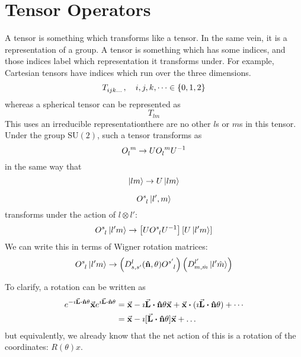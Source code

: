 \documentclass[a4paper,twoside,master.tex]{subfiles}
\begin{document}

\section{Tensor Operators}
\label{sec:tensor_operators}

A tensor is something which transforms like a tensor. In the same vein, it is a representation of a group. A tensor is something which has some indices, and those indices label which representation it transforms under. For example, Cartesian tensors have indices which run over the three dimensions.
\begin{equation}
    T\indices{_{ijk\ldots}} \qc i,j,k,\cdots \in \{0,1,2\}
\end{equation}
whereas a spherical tensor can be represented as
\begin{equation}
    T_{lm}
\end{equation}
This uses an irreducible representation\textemdash there are no other $ l $s or $ m $s in this tensor. Under the group $\text{SU}(2)$, such a tensor transforms as
\begin{equation}
    O\indices{_l^m} \to U O\indices{_l^m} U^{-1}
\end{equation}
in the same way that
\begin{equation}
    \ket{lm} \to U\ket{lm}
\end{equation}

\begin{equation}
    O\indices{^s_l}\ket{l',m}
\end{equation}
transforms under the action of $ l \otimes l' $:
\begin{equation}
    O\indices{^s_l}\ket{l'm} \to \left[ U O\indices{^s_l} U^{-1} \right] \left[ U\ket{l'm} \right]
\end{equation}
We can write this in terms of Wigner rotation matrices:
\begin{equation}
    O\indices{^s_l}\ket{l'm} \to \left( D^l_{s,s'}(\vu{n}, \theta) O\indices{^{s'}_l} \right) \left( D^{l'}_{m,\hat{m}}\ket{l'\hat{m}} \right)
\end{equation}

To clarify, a rotation can be written as
\begin{align}
    e^{- \imath \va{L} \vdot \vu{n} \theta} \va{x} e^{\imath \va{L} \vdot \vu{n} \theta} &= \va{x} - \imath \va{L} \vdot \vu{n} \theta \va{x} + \va{x} \vdot (\imath \va{L} \vdot \vu{n} \theta) + \cdots \\
    &= \va{x} - \imath [ \va{L} \vdot \vu{n} \theta ] \va{x} + \ldots
\end{align}
but equivalently, we already know that the net action of this is a rotation of the coordinates: $ R(\theta) x $.
\end{document}
